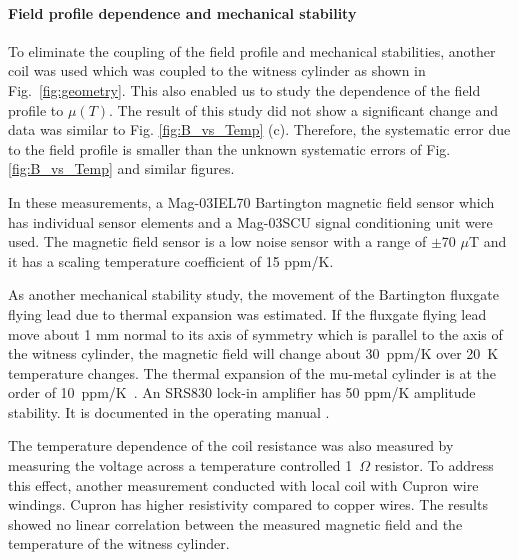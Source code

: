 \paragraph{Field profile dependence and mechanical stability}


To eliminate the coupling of the field profile and mechanical
stabilities, another coil was used which was coupled to the witness
cylinder as shown in Fig.~\ref{fig:geometry}.  This also enabled us to
study the dependence of the field profile to $\mu(T)$. The result of
this study did not show a significant change and data was similar to
Fig. \ref{fig:B_vs_Temp} (c). Therefore, the systematic error due to
the field profile is smaller than the unknown systematic errors of
Fig. \ref{fig:B_vs_Temp} and similar figures.


In these measurements, a Mag-03IEL70 Bartington magnetic field sensor which has individual sensor elements and a Mag-03SCU signal conditioning unit were used.
The magnetic field sensor is a low noise sensor with a range of $\pm$70 $\mu$T and it has a scaling temperature coefficient of 15 ppm/K.


As another mechanical stability study, the movement of the Bartington
fluxgate flying lead due to thermal expansion was estimated. If the
fluxgate flying lead move about 1 mm normal to its axis of symmetry
which is parallel to the axis of the witness cylinder, the magnetic
field will change about 30~ppm/K over 20~K temperature changes.  The
thermal expansion of the mu-metal cylinder is at the order of
10~ppm/K~\cite{kruppvdm}.  An SRS830 lock-in amplifier has 50
ppm/K amplitude stability. It is documented in the operating
manual \cite{bib:lockin}.

The temperature dependence of the coil resistance was also measured by
measuring the voltage across a temperature controlled 1~$\Omega$
resistor.
To address this effect, another measurement conducted with local coil with Cupron wire windings. Cupron has higher resistivity compared to copper wires. The results showed no linear correlation between the measured magnetic field and the temperature of the witness cylinder.

